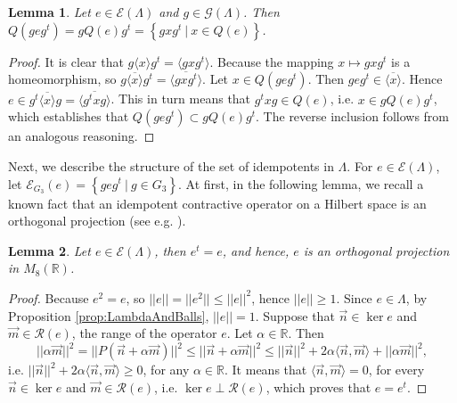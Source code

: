 \documentclass[12pt]{article}
\theoremstyle{plain}
\newtheorem{lemma}{Lemma}
\theoremstyle{definition}
\theoremstyle{remark}
\numberwithin{equation}{section}
\begin{document}
\begin{lemma}
    \label{lem:equivClassesOfQe}
    Let $e \in \mathcal{E}(\Lambda)$ and $g \in \mathcal{G}(\Lambda)$.
    Then $Q(g e g^{t}) = g Q(e) g^{t} = 
    \left \{ g x g^{t} \: | \: x \in Q(e) \right \}$.
\end{lemma}
\begin{proof}
    It is clear that $g \langle x \rangle g^{t} = \langle g x g^{t} \rangle$.
    Because the mapping $x \mapsto g x g^{t}$ is a homeomorphism,
    so $g \overline{\langle x \rangle} g^{t} = \overline{\langle g x g^{t} \rangle}$.
    Let $x \in Q(g e g^{t})$.
    Then $g e g^{t} \in \overline{\langle x \rangle}$.
    Hence $e \in g^{t} \overline{\langle x \rangle} g = \overline{\langle g^{t} x g \rangle}$.
    This in turn means that $g^{t} x g \in Q(e)$, i.e.
    $x \in g Q(e) g^{t}$, which establishes that
    $Q(g e g^{t}) \subset g Q(e) g^{t}$.
    The reverse inclusion follows from an analogous reasoning.
\end{proof}

Next, we describe the structure of the set of idempotents
in $\Lambda$.
For $e \in \mathcal{E}(\Lambda)$,
let $\mathcal{E}_{G_{3}}(e) = \left \{ g e g^{t} \: | \: g \in G_{3} \right \}$.
At first, in the following lemma, we recall a known fact
that an idempotent contractive operator on a Hilbert space 
is an orthogonal projection 
(see e.g. \cite[Problem 5.3.14]{abramovich2002problems}).
\begin{lemma}
    \label{lem:eIsProj}
    Let $e \in \mathcal{E}(\Lambda)$, then $e^{t} = e$, and hence,
    $e$ is an orthogonal projection in $M_{8}(\mathbb{R})$.
\end{lemma}
\begin{proof}
    Because $e^{2} = e$, so $||e|| = ||e^{2}|| \leq ||e||^{2}$,
    hence $||e|| \geq 1$.
    Since $e \in \Lambda$, by Proposition \ref{prop:LambdaAndBalls}, $||e|| =1$.
    Suppose that $\vec{n} \in \ker e$ and $\vec{m} \in \mathcal{R}(e)$,
    the range of the operator $e$.
    Let $\alpha \in \mathbb{R}$.
    Then 
\begin{equation}
    || \alpha \vec{m} ||^{2} = || P (\vec{n} + \alpha \vec{m}) ||^{2} \leq
    || \vec{n} + \alpha \vec{m}||^{2} \leq ||\vec{n}||^{2} + 
        2 \alpha \langle \vec{n}, \vec{m} \rangle + || \alpha \vec{m}||^{2},
\end{equation}
i.e. $||\vec{n}||^{2} + 2 \alpha  \langle \vec{n}, \vec{m} \rangle \geq 0$,
for any $\alpha \in \mathbb{R}$.
It means that 
$\langle \vec{n}, \vec{m} \rangle = 0$,
for every  $\vec{n} \in \ker e$ and $\vec{m} \in \mathcal{R}(e)$,
i.e.
$\ker e \perp \mathcal{R}(e)$, which proves that $e = e^{t}$.
\end{proof}
\end{document}
